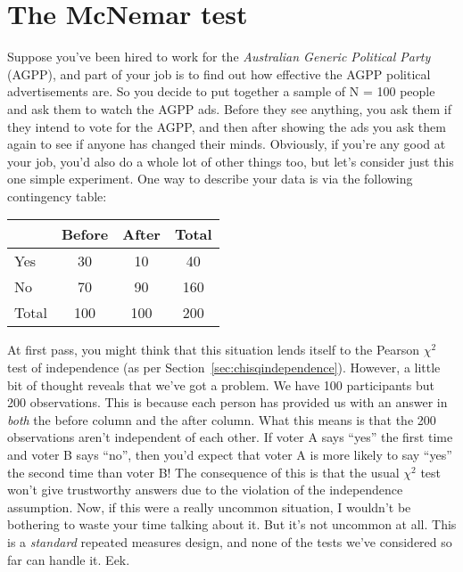\section{The McNemar test~\label{sec:mcnemar}}

Suppose you've been hired to work for the {\it Australian Generic Political Party} (AGPP), and part of your job is to find out how effective the AGPP political advertisements are. So you decide to put together a sample of N = 100 people and ask them to watch the AGPP ads. Before they see anything, you ask them if they intend to vote for the AGPP, and then after showing the ads you ask them again to see if anyone has changed their minds. Obviously, if you're any good at your job, you'd also do a whole lot of other things too, but let's consider just this one simple experiment. One way to describe your data is via the following contingency table:

\begin{center}
\begin{tabular}{l|cc|c}
& Before & After & Total \\ \hline
Yes   & 30 & 10 & 40 \\
No    & 70 & 90 & 160 \\ \hline
Total & 100 & 100 & 200
\end{tabular}
\end{center}

\noindent
At first pass, you might think that this situation lends itself to the Pearson $\chi^2$ test of independence (as per Section~\ref{sec:chisqindependence}). However, a little bit of thought reveals that we've got a problem. We have 100 participants but 200 observations. This is because each person has provided us with an answer in {\it both} the before column and the after column. What this means is that the 200 observations aren't independent of each other. If voter A says ``yes'' the first time and voter B says ``no'', then you'd expect that voter A is more likely to say ``yes'' the second time than voter B! The consequence of this is that the usual $\chi^2$ test won't give trustworthy answers due to the violation of the independence assumption. Now, if this were a really uncommon situation, I wouldn't be bothering to waste your time talking about it. But it's not uncommon at all. This is a {\it standard} repeated measures design, and none of the tests we've considered so far can handle it. Eek. 

